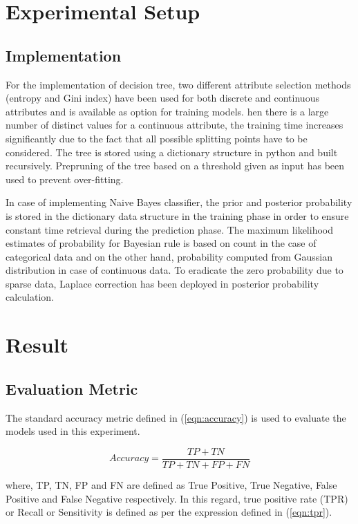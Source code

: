 \documentclass[12pt]{article}
\begin{document}
\section{Experimental Setup}
\subsection{Implementation}
For the implementation of decision tree, two different attribute selection methods (entropy and Gini index) have been used for both discrete and continuous attributes and is available as option for training models. hen there is a large number of distinct values for a continuous attribute, the training time increases significantly due to the fact that all possible splitting points have to be considered. The tree is stored using a dictionary structure in python and built recursively. Prepruning of the tree based on a threshold given as input has been used to prevent over-fitting.

In case of implementing Naive Bayes classifier, the prior and posterior probability is stored in the dictionary data structure in the training phase in order to ensure constant time retrieval during the prediction phase. The maximum likelihood estimates of probability for Bayesian rule is based on count in the case of categorical data and on the other hand, probability computed from Gaussian distribution in case of continuous data. To eradicate the zero probability due to sparse data, Laplace correction has been deployed in posterior probability calculation.  


 
\section{Result}
\subsection{Evaluation Metric}
The standard accuracy metric defined in (\ref{eqn:accuracy}) is used to evaluate the models used in this experiment.

\begin{equation}
\label{eqn:accuracy}
Accuracy = \frac{TP + TN}{TP + TN + FP + FN}
\end{equation} 

where, TP, TN, FP and FN are defined as True Positive, True Negative, False Positive and False Negative respectively. In this regard, true positive rate (TPR) or Recall or Sensitivity is defined as per the expression defined in (\ref{eqn:tpr}).
\end{document}
